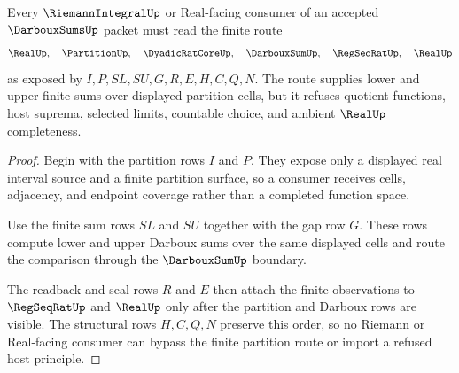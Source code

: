 \begin{theorem}
\label{thm:darboux-sums-real-partition-scope}
Every $\RiemannIntegralUp$ or Real-facing consumer of an accepted $\DarbouxSumsUp$ packet must read the finite route
$$
\RealUp,\quad \PartitionUp,\quad \DyadicRatCoreUp,\quad \DarbouxSumUp,\quad \RegSeqRatUp,\quad \RealUp
$$
as exposed by $I,P,SL,SU,G,R,E,H,C,Q,N$. The route supplies lower and upper finite sums over displayed partition cells, but it refuses quotient functions, host suprema, selected limits, countable choice, and ambient $\RealUp$ completeness.
\end{theorem}
\begin{proof}
Begin with the partition rows $I$ and $P$. They expose only a displayed real interval source and a finite partition surface, so a consumer receives cells, adjacency, and endpoint coverage rather than a completed function space.

Use the finite sum rows $SL$ and $SU$ together with the gap row $G$. These rows compute lower and upper Darboux sums over the same displayed cells and route the comparison through the $\DarbouxSumUp$ boundary.

The readback and seal rows $R$ and $E$ then attach the finite observations to $\RegSeqRatUp$ and $\RealUp$ only after the partition and Darboux rows are visible. The structural rows $H,C,Q,N$ preserve this order, so no Riemann or Real-facing consumer can bypass the finite partition route or import a refused host principle.
\end{proof}


\begin{closurestatus}{\DarbouxSumsUp}
  \theoryclosure{\seedClosure}
  \formalstatus{\unformalizedV}
\end{closurestatus}
